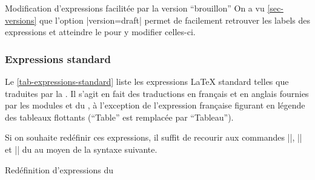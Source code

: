 \begin{dbremark}{Modification d'expressions facilitée par la version
    \enquote{brouillon}}{}
  On a vu \vref{sec-versions} que l'option |version=draft| permet de facilement
  retrouver les labels des expressions et atteindre le \File{\configurationfile}
  pour y modifier celles-ci.
\end{dbremark}

\subsubsection{Expressions standard}
\label{sec-expressions-standard}

Le \vref{tab-expressions-standard} liste les expressions \LaTeX{} standard
telles que traduites par la \yatcl{}. Il s'agit en fait des traductions en
français et en anglais fournies par les modules  et
 du , à l'exception de l'expression française
figurant en légende des tableaux flottants (\enquote{Table} est remplacée par
\enquote{Tableau}).%

Si on souhaite redéfinir ces expressions, il suffit de recourir aux commandes
|\addto|, |\captionsfrench| et |\captionsenglish| du  au moyen
de la syntaxe suivante.

\begin{preamblecode}[title=Par exemple dans le \File{\configurationfile}]
\addto{}
\addto{}
\end{preamblecode}
\begin{table}[hb]
  \centering
  \caption{Valeurs et commandes d'expressions \LaTeX{} standard fournies par la \yatcl{}}
  \label{tab-expressions-standard}
  
\end{table}
\begin{dbexample}{Redéfinition d'expressions du }{}
\begin{preamblecode}[title=Par exemple dans le \File{\configurationfile}]
\addto{}
\addto{}
\end{preamblecode}
\end{dbexample}

